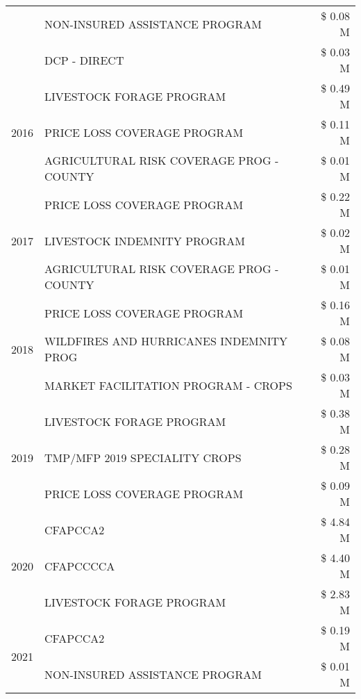 \begin{tabular}{llr}
 & NON-INSURED ASSISTANCE PROGRAM & \$ 0.08 M \\
 & DCP - DIRECT & \$ 0.03 M \\
\cline{1-3}
\multirow[t]{3}{*}{2016} & LIVESTOCK FORAGE PROGRAM & \$ 0.49 M \\
 & PRICE LOSS COVERAGE PROGRAM & \$ 0.11 M \\
 & AGRICULTURAL RISK COVERAGE PROG - COUNTY & \$ 0.01 M \\
\cline{1-3}
\multirow[t]{3}{*}{2017} & PRICE LOSS COVERAGE PROGRAM & \$ 0.22 M \\
 & LIVESTOCK INDEMNITY PROGRAM & \$ 0.02 M \\
 & AGRICULTURAL RISK COVERAGE PROG - COUNTY & \$ 0.01 M \\
\cline{1-3}
\multirow[t]{3}{*}{2018} & PRICE LOSS COVERAGE PROGRAM & \$ 0.16 M \\
 & WILDFIRES AND HURRICANES INDEMNITY PROG & \$ 0.08 M \\
 & MARKET FACILITATION PROGRAM - CROPS & \$ 0.03 M \\
\cline{1-3}
\multirow[t]{3}{*}{2019} & LIVESTOCK FORAGE PROGRAM & \$ 0.38 M \\
 & TMP/MFP 2019 SPECIALITY CROPS & \$ 0.28 M \\
 & PRICE LOSS COVERAGE PROGRAM & \$ 0.09 M \\
\cline{1-3}
\multirow[t]{3}{*}{2020} & CFAPCCA2 & \$ 4.84 M \\
 & CFAPCCCCA & \$ 4.40 M \\
 & LIVESTOCK FORAGE PROGRAM & \$ 2.83 M \\
\cline{1-3}
\multirow[t]{2}{*}{2021} & CFAPCCA2 & \$ 0.19 M \\
 & NON-INSURED ASSISTANCE PROGRAM & \$ 0.01 M \\
\cline{1-3}
\bottomrule
\end{tabular}

